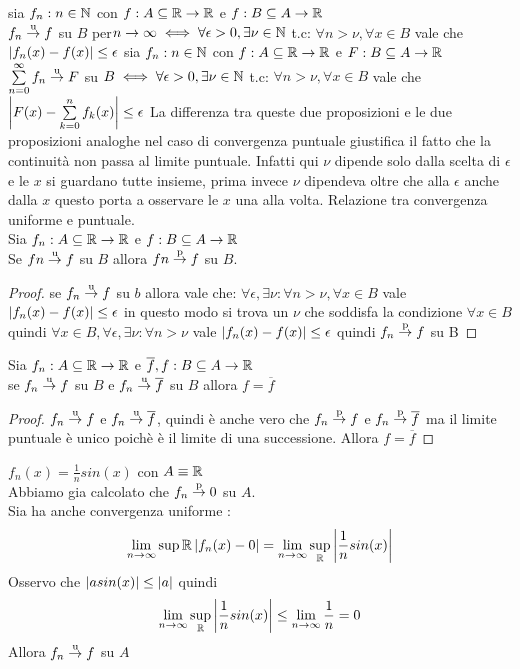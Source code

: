 \proposition
sia $f_n:n\in\mathbb{N}$ con $f:A\subseteq \mathbb{R}\to \mathbb{R}$ e $f:B\subseteq A \to  \mathbb{R}$\\
$f_n \overset{\text{u}}{\to} f$ su $B$ per$n\to\infty \iff \forall\epsilon >0, \exists\nu\in\mathbb{N}$  t.c: $\forall n>\nu, \forall x\in B$ vale che $\left|f_n(x)-f(x)\right|\le\epsilon$
\proposition
sia $f_n:n\in\mathbb{N}$ con $f:A\subseteq \mathbb{R}\to \mathbb{R}$ e $F:B\subseteq A \to  \mathbb{R}$\\
$\sum\limits_{n=0}^{\infty}f_n \overset{\text{u}}{\to} F$ su $B\iff \forall\epsilon >0, \exists\nu\in\mathbb{N}$  t.c: $\forall n>\nu, \forall x\in B$ vale che $\left|F(x)-\sum\limits_{k=0}^{n}f_k(x)\right|\le\epsilon$
\observation
La differenza tra queste due proposizioni e le due proposizioni analoghe nel caso di convergenza puntuale giustifica il fatto che la continuità non passa al limite puntuale. Infatti qui $\nu$ dipende solo dalla scelta di $\epsilon$ e le $x$ si guardano tutte insieme, prima invece $\nu$ dipendeva oltre che alla $\epsilon$ anche dalla $x$ questo porta a osservare le $x$ una alla volta.
\proposition Relazione tra convergenza uniforme e puntuale.\\
Sia $f_n:A\subseteq \mathbb{R}\to \mathbb{R}$ e $f:B\subseteq A\to \mathbb{R}$\\
Se $fn \overset{\text{u}}{\to} f$ su $B$ allora $fn \overset{\text{p}}{\to} f$ su $B$.
\begin{proof}
	se $f_n \overset{\text{u}}{\to} f$ su $b$ allora vale che:
	$\forall\epsilon, \exists\nu : \forall n>\nu, \forall x\in B $ vale $\left|f_n(x)-f(x)\right|\le\epsilon$ in questo modo si trova un $\nu$ che soddisfa la condizione $\forall x \in B$ quindi $\forall x\in B, \forall\epsilon, \exists\nu : \forall n>\nu $ vale $\left|f_n(x)-f(x)\right|\le\epsilon$ quindi $f_n \overset{\text{p}}{\to} f$ su B
\end{proof}
\proposition
Sia $f_n:A\subseteq \mathbb{R}\to \mathbb{R}$ e $\overline{f},f:B\subseteq A\to \mathbb{R}$\\
se $f_n \overset{\text{u}}{\to} f$ su $B$ e $f_n \overset{\text{u}}{\to} \overline{f}$ su $B$ allora $f=\overline{f}$
\begin{proof}
	$f_n \overset{\text{u}}{\to} f$ e $f_n \overset{\text{u}}{\to} \overline{f}$, quindi è anche vero che $f_n \overset{\text{p}}{\to} f$ e $f_n \overset{\text{p}}{\to} \overline{f}$ ma il limite puntuale è unico poichè è il limite di una successione. Allora $f=\overline{f}$
\end{proof}
\example $f_n(x)=\frac{1}{n}sin(x)$ con $A\equiv \mathbb{R}$\\
Abbiamo gia calcolato che $f_n \overset{\text{p}}{\to} 0$ su $A$.\\
Sia ha anche convergenza uniforme :\\
$$\lim\limits_{n\to\infty}\sup{ \mathbb{R}}\left|f_n(x)-0\right| = \lim\limits_{n\to\infty}\sup\limits_{ \mathbb{R}}\left|\frac{1}{n}sin(x)\right|$$
Osservo che $\left|asin(x)\right|\le\left|a\right|$ quindi
$$\lim\limits_{n\to\infty}\sup\limits_{ \mathbb{R}}\left|\frac{1}{n}sin(x)\right|\le\lim\limits_{n\to\infty}\frac{1}{n}=0$$
Allora $f_n \overset{\text{u}}{\to} f$ su $A$

